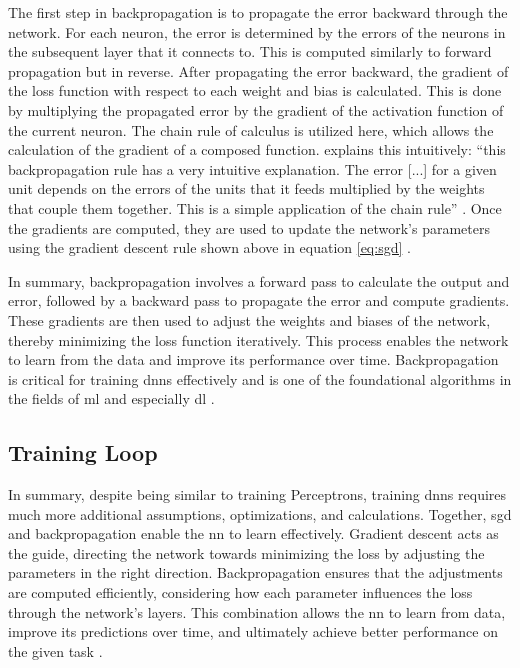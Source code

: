 The first step in backpropagation is to propagate the error backward through the network. For each neuron, the error is determined by the errors of the neurons in the subsequent layer that it connects to. This is computed similarly to forward propagation but in reverse. After propagating the error backward, the gradient of the loss function with respect to each weight and bias is calculated. This is done by multiplying the propagated error by the gradient of the activation function of the current neuron. The chain rule of calculus is utilized here, which allows the calculation of the gradient of a composed function. \textcite{Szeliski2022} explains this intuitively: \enquote{this backpropagation rule has a very intuitive explanation. The error [...] for a given unit depends on the errors of the units that it feeds multiplied by the weights that couple them together. This is a simple application of the chain rule} \autocite[286]{Szeliski2022}. Once the gradients are computed, they are used to update the network's parameters using the gradient descent rule shown above in equation \ref{eq:sgd} \autocite{Goodfellow.Bengio.ea2016,LeCun.Bottou.ea2012,LeCun.Bengio.ea2015,Szeliski2022,Zhang.Lipton.ea2023}. 

In summary, backpropagation involves a forward pass to calculate the output and error, followed by a backward pass to propagate the error and compute gradients. These gradients are then used to adjust the weights and biases of the network, thereby minimizing the loss function iteratively. This process enables the network to learn from the data and improve its performance over time. Backpropagation is critical for training \glspl{dnn} effectively and is one of the foundational algorithms in the fields of \gls{ml} and especially \gls{dl} \autocite{Goodfellow.Bengio.ea2016,LeCun.Bengio.ea2015,Szeliski2022,Zhang.Lipton.ea2023}.

\subsection{Training Loop}

In summary, despite being similar to training Perceptrons, training \glspl{dnn} requires much more additional assumptions, optimizations, and calculations. Together, \gls{sgd} and backpropagation enable the \gls{nn} to learn effectively. Gradient descent acts as the guide, directing the network towards minimizing the loss by adjusting the parameters in the right direction. Backpropagation ensures that the adjustments are computed efficiently, considering how each parameter influences the loss through the network's layers. This combination allows the \gls{nn} to learn from data, improve its predictions over time, and ultimately achieve better performance on the given task \autocite{Szeliski2022,LeCun.Bottou.ea2012}.

